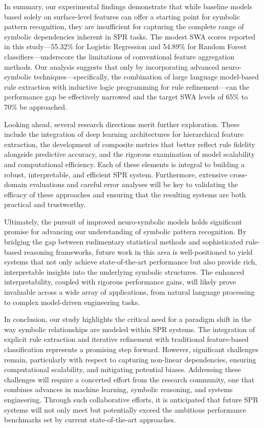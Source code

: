 \documentclass{article}
\begin{document}
In summary, our experimental findings demonstrate that while baseline models based solely on surface-level features can offer a starting point for symbolic pattern recognition, they are insufficient for capturing the complete range of symbolic dependencies inherent in SPR tasks. The modest SWA scores reported in this study—55.32\% for Logistic Regression and 54.89\% for Random Forest classifiers—underscore the limitations of conventional feature aggregation methods. Our analysis suggests that only by incorporating advanced neuro-symbolic techniques—specifically, the combination of large language model-based rule extraction with inductive logic programming for rule refinement—can the performance gap be effectively narrowed and the target SWA levels of 65\% to 70\% be approached.

Looking ahead, several research directions merit further exploration. These include the integration of deep learning architectures for hierarchical feature extraction, the development of composite metrics that better reflect rule fidelity alongside predictive accuracy, and the rigorous examination of model scalability and computational efficiency. Each of these elements is integral to building a robust, interpretable, and efficient SPR system. Furthermore, extensive cross-domain evaluations and careful error analyses will be key to validating the efficacy of these approaches and ensuring that the resulting systems are both practical and trustworthy.

Ultimately, the pursuit of improved neuro-symbolic models holds significant promise for advancing our understanding of symbolic pattern recognition. By bridging the gap between rudimentary statistical methods and sophisticated rule-based reasoning frameworks, future work in this area is well-positioned to yield systems that not only achieve state-of-the-art performance but also provide rich, interpretable insights into the underlying symbolic structures. The enhanced interpretability, coupled with rigorous performance gains, will likely prove invaluable across a wide array of applications, from natural language processing to complex model-driven engineering tasks.

In conclusion, our study highlights the critical need for a paradigm shift in the way symbolic relationships are modeled within SPR systems. The integration of explicit rule extraction and iterative refinement with traditional feature-based classification represents a promising step forward. However, significant challenges remain, particularly with respect to capturing non-linear dependencies, ensuring computational scalability, and mitigating potential biases. Addressing these challenges will require a concerted effort from the research community, one that combines advances in machine learning, symbolic reasoning, and systems engineering. Through such collaborative efforts, it is anticipated that future SPR systems will not only meet but potentially exceed the ambitious performance benchmarks set by current state-of-the-art approaches.
\end{document}
